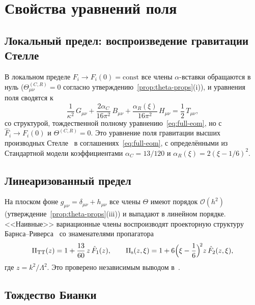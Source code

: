 \documentclass[12pt,a4paper]{article}
\newcommand{\PiTT}{\Pi_{\mathrm{TT}}}
\newcommand{\Pis}{\Pi_{\mathrm{s}}}
\newcommand{\order}{\mathcal{O}}
\newcommand{\Lam}{\Lambda}
\theoremstyle{plain}
\theoremstyle{definition}
\begin{document}
\section{Свойства уравнений поля}
\label{sec:properties}

\subsection{Локальный предел: воспроизведение гравитации Стелле}
\label{sec:local-limit}

В локальном пределе $F_i \to F_i(0) = \mathrm{const}$ все члены
$\alpha$-вставки обращаются в нуль ($\Theta^{(C,R)}_{\mu\nu} = 0$ согласно
утверждению~\ref{prop:theta-props}(i)), и уравнения поля сводятся к
\begin{equation}\label{eq:stelle-eom}
  \frac{1}{\kappa^2}\,G_{\mu\nu}
  + \frac{2\alpha_C}{16\pi^2}\,B_{\mu\nu}
  + \frac{\alpha_R(\xi)}{16\pi^2}\,H_{\mu\nu}
  = \frac{1}{2}\,T_{\mu\nu},
\end{equation}
со структурой, тождественной полному уравнению~\eqref{eq:full-eom},
но с $\hat{F}_i \to F_i(0)$ и $\Theta^{(C,R)} = 0$.
Это уравнение поля гравитации высших производных
Стелле~\cite{Stelle:1978} в соглашениях~\eqref{eq:full-eom},
с определёнными из Стандартной модели коэффициентами
$\alpha_C = 13/120$ и $\alpha_R(\xi) = 2(\xi - 1/6)^2$.

\subsection{Линеаризованный предел}
\label{sec:linearized-limit-check}

На плоском фоне $g_{\mu\nu} = \delta_{\mu\nu} + h_{\mu\nu}$ все
члены $\Theta$ имеют порядок $\order(h^2)$
(утверждение~\ref{prop:theta-props}(iii)) и выпадают в линейном порядке.
<<Наивные>> вариационные члены воспроизводят проекторную структуру
Барнса--Риверса~\cite{Barnes:1965,Rivers:1964} со знаменателями
пропагатора
\begin{equation}\label{eq:propagator-denominators}
  \PiTT(z) = 1 + \frac{13}{60}\,z\,\hat{F}_1(z),
  \qquad
  \Pis(z,\xi) = 1 + 6\Bigl(\xi - \frac{1}{6}\Bigr)^{\!2}
  z\,\hat{F}_2(z,\xi),
\end{equation}
где $z = k^2/\Lam^2$.  Это проверено независимым выводом в~\cite{Alfyorov:2026ff}.

\subsection{Тождество Бианки}
\end{document}
